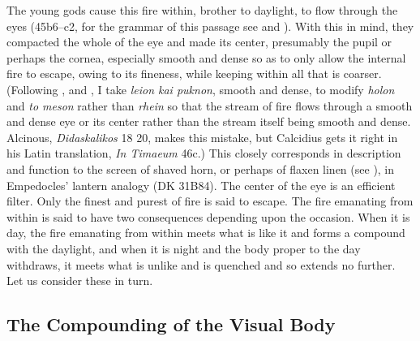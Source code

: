 The young gods cause this fire within, brother to daylight, to flow through the eyes (45b6--c2, for the grammar of this passage see \citealt[63 123--127]{Cook-Wilson:1889cs} and \citealt[277]{Taylor:1928qb}). With this in mind, they compacted the whole of the eye and made its center, presumably the pupil or perhaps the cornea, especially smooth and dense so as to only allow the internal fire to escape, owing to its fineness, while keeping within all that is coarser. (Following \citealt[125--6]{Cook-Wilson:1889cs}, \citealt[277]{Taylor:1928qb} and \citealt[152]{Cornford:1935fk}, I take \emph{leion kai puknon}, smooth and dense, to modify \emph{holon} and \emph{to meson} rather than \emph{rhein} so that the stream of fire flows through a smooth and dense eye or its center rather than the stream itself being smooth and dense. Alcinous, \emph{Didaskalikos} 18 20, makes this mistake, but Calcidius gets it right in his Latin translation, \emph{In Timaeum} 46c.) This closely corresponds in description and function to the screen of shaved horn, or perhaps of flaxen linen (see \citealt[240--1]{Wright:1981zr}), in Empedocles' lantern analogy (DK 31B84). The center of the eye is an efficient filter. Only the finest and purest of fire is said to escape. The fire emanating from within is said to have two consequences depending upon the occasion. When it is day, the fire emanating from within meets what is like it and forms a compound with the daylight, and when it is night and the body proper to the day withdraws, it meets what is unlike and is quenched and so extends no further. Let us consider these in turn.


\subsection{The Compounding of the Visual Body} %
\label{sub:the_compounding_of_the_visual_body}

